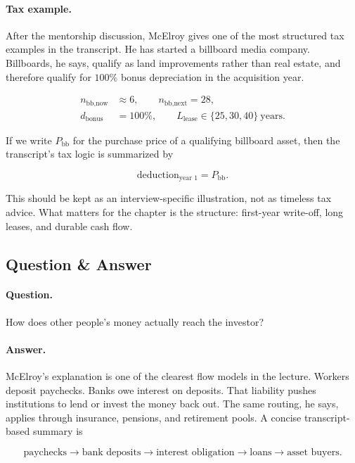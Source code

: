 \paragraph{Tax example.} After the mentorship discussion, McElroy gives one of the most structured tax examples in the transcript. He has started a billboard media company. Billboards, he says, qualify as land improvements rather than real estate, and therefore qualify for \(100\%\) bonus depreciation in the acquisition year.

\begin{align}
n_{\text{bb,now}} &\approx 6,\qquad n_{\text{bb,next}} = 28,\\
d_{\text{bonus}} &= 100\%,\qquad L_{\text{lease}} \in \{25,30,40\}\ \text{years}.
\end{align}

If we write \(P_{\text{bb}}\) for the purchase price of a qualifying billboard asset, then the transcript's tax logic is summarized by

\begin{equation}
\text{deduction}_{\text{year 1}} = P_{\text{bb}}.
\end{equation}

This should be kept as an interview-specific illustration, not as timeless tax advice. What matters for the chapter is the structure: first-year write-off, long leases, and durable cash flow.

\subsection{Question \& Answer}

\paragraph{Question.} How does other people's money actually reach the investor?

\paragraph{Answer.} McElroy's explanation is one of the clearest flow models in the lecture. Workers deposit paychecks. Banks owe interest on deposits. That liability pushes institutions to lend or invest the money back out. The same routing, he says, applies through insurance, pensions, and retirement pools. A concise transcript-based summary is

\begin{equation}
\text{paychecks} \to \text{bank deposits} \to \text{interest obligation} \to \text{loans} \to \text{asset buyers}.
\end{equation}

